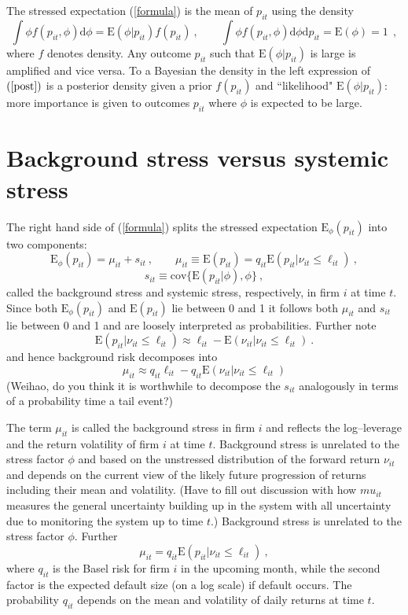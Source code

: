 \documentclass[authoryear]{elsarticle}
\newcommand{\E}{\mathrm{E}}
\newcommand{\cov}{\mathrm{cov}}
\newcommand{\Es}{\E_\phi}
\newcommand{\de}{\mathrm{d}}
\newcommand{\eref}[1]{(\ref{#1})}
\newcommand{\cq}{\ , \qquad}
\newcommand{\be}[1]{\begin{equation}\label{#1}}
\newcommand{\ee}{\end{equation}}
\begin{document}
The stressed expectation \eref{formula}  is the mean of $p_{it}$  using the  density
\be{post}
\int \phi f(p_{it},\phi)\de \phi= \E(\phi|p_{it})f(p_{it})\cq \int \phi f(p_{it},\phi)\de \phi\de p_{it} = \E(\phi) = 1\ 
\  ,
\ee
where $f$ denotes density.  
Any outcome $p_{it}$ such that $\E(\phi|p_{it})$ is large  is amplified and vice versa.   To a Bayesian the density in the left  expression of $\eref{post}$ is a posterior density given a prior $f(p_{it})$ and ``likelihood" $\E(\phi|p_{it})$: more importance is given to outcomes   $p_{it}$  where $\phi$ is expected to be large. 

\section{Background stress versus systemic stress}

The right hand side of \eref{formula} splits the stressed expectation $\Es(p_{it})$ into two components: 
\be{vsstress}
\Es(p_{it}) =\mu_{it}+s_{it}\cq 
 \mu_{it} \equiv \E(p_{it})=q_{it}\E(p_{it}|\nu_{it}\le \ell_{it}) \ ,
\ee
$$
s_{it} \equiv \cov\{\E(p_{it}|\phi),\phi\}\ , 
$$
called  the background stress  and systemic stress, respectively, in firm $i$ at time $t$.  Since both $\Es(p_{it})$ and $\E(p_{it})$ lie between 0 and 1 it follows both $\mu_{it}$ and $s_{it}$ lie between 0 and 1 and  are loosely interpreted as probabilities.  Further note 
$$
\E(p_{it}|\nu_{it}\le \ell_{it}) \approx \ell_{it}-\E(\nu_{it}|\nu_{it}\le \ell_{it})\ .
$$
and hence background risk decomposes into
$$
\mu_{it} \approx q_{it}\ell_{it} - q_{it}\E(\nu_{it}|\nu_{it}\le \ell_{it})
$$
(Weihao, do you think it is worthwhile to decompose the $s_{it}$ analogously in terms of a probability time a tail event?) 

The  term $\mu_{it}$  is called the background stress in firm $i$ and  reflects the log--leverage and the return volatility of firm $i$ at time $t$.  Background stress is unrelated to the stress factor $\phi$ and based on the unstressed distribution of the forward return $\nu_{it}$ and depends on the current view of the likely future progression of returns including their mean and volatility.     (Have to fill out discussion with how $mu_{it}$ measures the general uncertainty building up in the system with all  uncertainty  due to monitoring the system up to time $t$.)  Background stress is unrelated to the stress factor $\phi$.  Further
\be{mstress}
\mu_{it}=q_{it}\E(p_{it}|\nu_{it}\le \ell_{it})\ ,
\ee
where  $q_{it}$ is the Basel risk for  firm $i$  in the upcoming month,  while the second factor is the expected default size  (on a log scale)  if default occurs.
The probability $q_{it}$ depends on the  mean and volatility of daily returns at time $t$.
\end{document}
